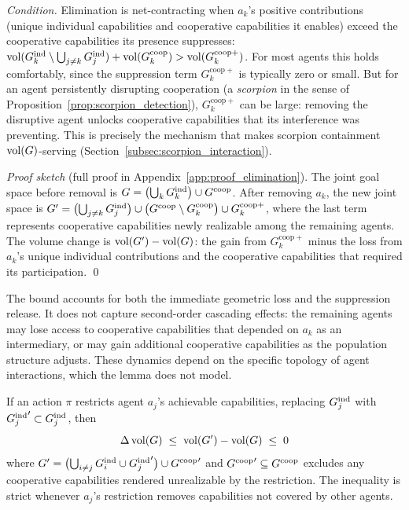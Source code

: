 \emph{Condition.} Elimination is net-contracting when $a_k$'s positive
contributions (unique individual capabilities and cooperative capabilities it
enables) exceed the cooperative capabilities its presence suppresses:
$\operatorname{vol}(G_{k}^{\mathrm{ind}} \setminus \bigcup_{j \neq k} G_{j}^{\mathrm{ind}}) +
\operatorname{vol}(G^{\mathrm{coop}}_{k}) > \operatorname{vol}(G^{\mathrm{coop}+}_{k})$. For most agents
this holds comfortably, since the suppression term $G^{\mathrm{coop}+}_{k}$ is
typically zero or small. But for an agent persistently disrupting cooperation
(a \emph{scorpion} in the sense of Proposition~\ref{prop:scorpion_detection}),
$G^{\mathrm{coop}+}_{k}$ can be large: removing the disruptive agent unlocks
cooperative capabilities that its interference was preventing. This is
precisely the mechanism that makes scorpion containment $\operatorname{vol}(G)$-serving
(Section~\ref{subsec:scorpion_interaction}).

\emph{Proof sketch} (full proof in Appendix~\ref{app:proof_elimination}).
The joint goal space before removal is $G =
\bigl(\bigcup_k G_{k}^{\mathrm{ind}}\bigr) \cup G^{\mathrm{coop}}$. After removing $a_k$, the new
joint space is $G' = \bigl(\bigcup_{j \neq k} G_{j}^{\mathrm{ind}}\bigr) \cup \bigl(G^{\mathrm{coop}}
\setminus G^{\mathrm{coop}}_{k}\bigr) \cup G^{\mathrm{coop}+}_{k}$, where the
last term represents cooperative capabilities newly realizable among the
remaining agents. The volume change is $\operatorname{vol}(G') - \operatorname{vol}(G)$: the gain from
$G^{\mathrm{coop}+}_{k}$ minus the loss from $a_k$'s unique individual
contributions and the cooperative capabilities that required its participation.
\qed

The bound accounts for both the immediate geometric loss and the suppression
release. It does not capture second-order cascading effects: the remaining
agents may lose access to cooperative capabilities that depended on $a_k$ as an
intermediary, or may gain additional cooperative capabilities as the population
structure adjusts. These dynamics depend on the specific topology of agent
interactions, which the lemma does not model.


\begin{lemma}
\label{lem:coercion}
If an action $\pi$ restricts agent $a_j$'s achievable capabilities, replacing $G_{j}^{\mathrm{ind}}$ with ${G_{j}^{\mathrm{ind}}}' \subset G_{j}^{\mathrm{ind}}$, then
\begin{equation}
\label{eq:coercion_bound}
\Delta \operatorname{vol}(G) \;\leq\; \operatorname{vol}(G') - \operatorname{vol}(G) \;\leq\; 0
\end{equation}
where $G' = \bigl(\bigcup_{i \neq j} G_{i}^{\mathrm{ind}} \cup {G_{j}^{\mathrm{ind}}}'\bigr) \cup
    {G^{\mathrm{coop}}}'$ and ${G^{\mathrm{coop}}}' \subseteq G^{\mathrm{coop}}$ excludes any cooperative
    capabilities rendered unrealizable by the restriction. The inequality is
    strict whenever $a_j$'s restriction removes capabilities not covered by
    other agents.
\end{lemma}

